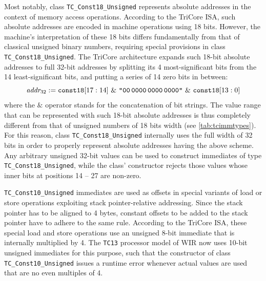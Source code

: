 Most notably, class \texttt{TC\_Const18\_Unsigned} represents absolute addresses in the context of memory access operations.
According to the TriCore \gls{ISA}, such absolute addresses are encoded in machine operations using 18 bits.
However, the machine's interpretation of these 18 bits differs fundamentally from that of classical unsigned binary numbers, requiring special provisions in class \texttt{TC\_Const18\_Unsigned}.
The TriCore architecture expands such 18-bit absolute addresses to full 32-bit addresses by splitting its 4 most-significant bits from the 14 least-significant bits, and putting a series of 14 zero bits in between:
\begin{displaymath}
  \textit{addr}_{32} := \texttt{const18}[17:14]\ \&\ \texttt{"00\,0000\,0000\,0000"}\ \&\ \texttt{const18}[13:0]
\end{displaymath}
where the $\&$ operator stands for the concatenation of bit strings.
The value range that can be represented with such 18-bit absolute addresses is thus completely different from that of unsigned numbers of 18 bits width (see \cref{tab:tcimmtypes}).
For this reason, class \texttt{TC\_Const18\_Unsigned} internally uses the full width of 32 bits in order to properly represent absolute addresses having the above scheme.
Any arbitrary unsigned 32-bit values can be used to construct immediates of type \texttt{TC\_Const18\_Unsigned}, while the class' constructor rejects those values whose inner bits at positions 14 -- 27 are non-zero.

\texttt{TC\_Const10\_Unsigned} immediates are used as offsets in special variants of load or store operations exploiting stack pointer-relative addressing.
Since the stack pointer has to be aligned to 4 bytes, constant offsets to be added to the stack pointer have to adhere to the same rule.
According to the TriCore \gls{ISA}, these special load and store operations use an unsigned 8-bit immediate that is internally multiplied by 4.
The \texttt{TC13} processor model of \gls{WIR} now uses 10-bit unsigned immediates for this purpose, such that the constructor of class \texttt{TC\_Const10\_Unsigned} issues a runtime error whenever actual values are used that are no even multiples of 4.

